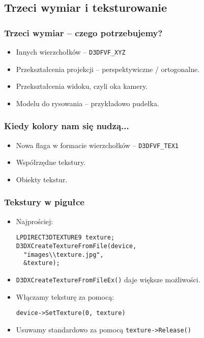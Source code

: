\documentclass{beamer}
\begin{document}
\subsection{Trzeci wymiar i teksturowanie}
\begin{frame}[fragile]
\frametitle{Trzeci wymiar -- czego potrzebujemy?}

\begin{itemize}
  \item<1-> Innych wierzchołków -- \texttt{D3DFVF\_XYZ}
  \item<2-> Przekształcenia projekcji -- perspektywiczne / ortogonalne.
  \item<3-> Przekształcenia widoku, czyli oka kamery.
  \item<4-> Modelu do rysowania -- przykładowo pudełka.
\end{itemize}

\end{frame}

\begin{frame}[fragile]
\frametitle{Kiedy kolory nam się nudzą...}

\begin{itemize}
  \item<1-> Nowa flaga w formacie wierzchołków -- \texttt{D3DFVF\_TEX1}
  \item<2-> Współrzędne tekstury.
  \item<3-> Obiekty tekstur.
\end{itemize}

\end{frame}

\begin{frame}[fragile]
\frametitle{Tekstury w pigułce}

\begin{itemize}
  \item<1-> Najprościej:
\begin{lstlisting}
LPDIRECT3DTEXTURE9 texture;
D3DXCreateTextureFromFile(device,
  "images\\texture.jpg",
  &texture);
\end{lstlisting}
  \item<2-> \texttt{D3DXCreateTextureFromFileEx()} daje większe możliwości.
  \item<3-> Włączamy teksturę za pomocą:
\begin{lstlisting}
device->SetTexture(0, texture)
\end{lstlisting}
  \item<4-> Usuwamy standardowo za pomocą \texttt{texture->Release()}
\end{itemize}

\end{frame}
\end{document}
